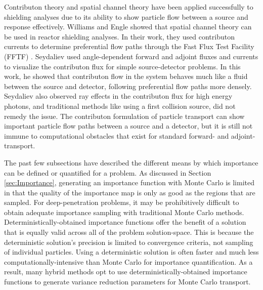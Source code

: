Contributon theory and spatial channel theory have been applied successfully to
shielding analyses \cite{seydaliev_contributon_2008, williams_SCC_shielding} due
to its ability to show particle flow between a source and response effectively.
Williams and Engle showed that
spatial channel theory can be used in reactor shielding analyses.
In their work, they used
contributon currents to determine preferential flow paths through the Fast Flux
Test Facility (FFTF) \cite{williams_SCC_shielding}.
Seydaliev \cite{seydaliev_contributon_2008} used angle-dependent forward and
adjoint
fluxes and currents to visualize the contributon flux for
simple source-detector problems. In this work, he showed that contributon flow
in the system behaves much like a fluid between the source and detector,
following preferential flow paths more densely.
Seydaliev also observed ray effects in the
contributon flux for high energy photons, and traditional methods like using a
first collision source, did not remedy the issue. The contributon formulation of
particle transport can show important particle flow paths between a source and a
detector, but it is still not immune to computational obstacles that exist for
standard forward- and adjoint- transport.

The past few subsections have described the different means by which importance
can be defined or quantified for a problem.
As discussed in Section \ref{sec:Importance}, generating an importance function
with Monte Carlo is limited in that the quality of the importance map is only as
good as the regions that are sampled. For deep-penetration problems, it may be
prohibitively difficult to obtain adequate importance sampling with traditional
Monte Carlo methods. Deterministically-obtained importance functions
offer the benefit of a solution that is equally valid across all of the problem
solution-space. This is because the deterministic solution's precision is
limited to convergence criteria, not sampling of individual particles. Using a
deterministic solution is often faster and much less computationally-intensive
than Monte Carlo for importance quantification.
As a result, many hybrid methods opt
to use deterministically-obtained importance functions to generate variance
reduction parameters for Monte Carlo transport.
